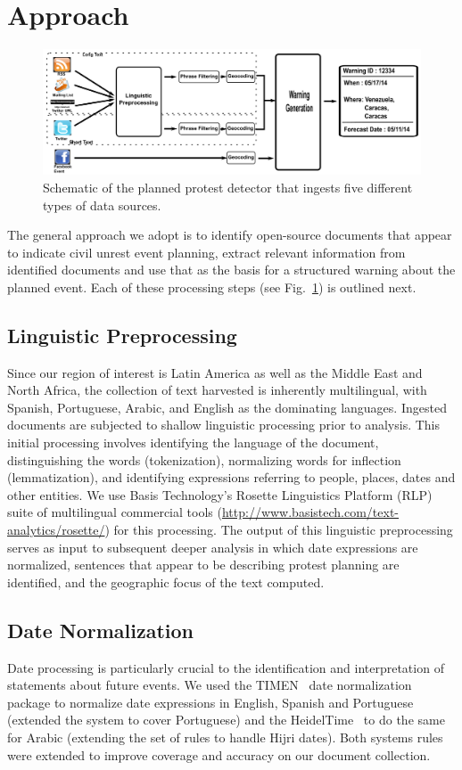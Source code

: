 \documentclass[letterpaper]{article}
\begin{document}
\section{Approach}
\begin{figure}
\includegraphics[width=\textwidth]{pipeline}
\caption{Schematic of the planned protest detector that ingests five
different types of data sources.}
\label{flowchart}
\end{figure}
The general approach we adopt is to identify open-source documents that
appear to indicate civil unrest event planning, extract relevant
information from identified documents and use that as the basis for a
structured warning about the planned event. 
Each of these processing steps (see Fig.~\ref{flowchart}) is outlined
next.

\subsection{Linguistic Preprocessing}
Since our region of interest is Latin America as well as the Middle East
and North Africa, the collection of text harvested is inherently
multilingual, with Spanish, Portuguese, Arabic, and English as the
dominating languages. Ingested documents are subjected to shallow
linguistic processing prior to analysis.  This initial processing
involves identifying the language of the document, distinguishing the
words (tokenization), normalizing words for inflection (lemmatization),
and identifying expressions referring to people, places, dates and other
entities.  We use Basis Technology's Rosette Linguistics Platform (RLP)
suite of multilingual commercial tools
(\url{http://www.basistech.com/text-analytics/rosette/}) for this
processing.  The output of this linguistic preprocessing serves as input
to subsequent deeper analysis in which date expressions are normalized,
sentences that appear to be describing protest planning are identified,
and the geographic focus of the text computed.

\subsection{Date Normalization}
Date processing is particularly crucial to the identification and
interpretation of statements about future events. We used the
TIMEN~\cite{LlorensDGS12} date normalization package to normalize date
expressions in English, Spanish and Portuguese (extended the system to
cover Portuguese) and the HeidelTime~\cite{strotgen2014time} to do the
same for Arabic (extending the set of rules to handle Hijri dates).
Both systems rules were extended to improve coverage and accuracy on our
document collection.
\end{document}
